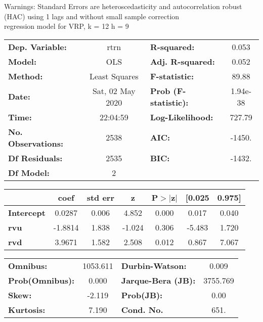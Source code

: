 Warnings: \newline
 [1] Standard Errors are heteroscedasticity and autocorrelation robust (HAC) using 1 lags and without small sample correction\\ 

regression model for VRP, k = 12 h = 9\begin{center}
\begin{tabular}{lclc}
\toprule
\textbf{Dep. Variable:}    &       rtrn       & \textbf{  R-squared:         } &     0.053   \\
\textbf{Model:}            &       OLS        & \textbf{  Adj. R-squared:    } &     0.052   \\
\textbf{Method:}           &  Least Squares   & \textbf{  F-statistic:       } &     89.88   \\
\textbf{Date:}             & Sat, 02 May 2020 & \textbf{  Prob (F-statistic):} &  1.94e-38   \\
\textbf{Time:}             &     22:04:59     & \textbf{  Log-Likelihood:    } &    727.79   \\
\textbf{No. Observations:} &        2538      & \textbf{  AIC:               } &    -1450.   \\
\textbf{Df Residuals:}     &        2535      & \textbf{  BIC:               } &    -1432.   \\
\textbf{Df Model:}         &           2      & \textbf{                     } &             \\
\bottomrule
\end{tabular}
\begin{tabular}{lcccccc}
                   & \textbf{coef} & \textbf{std err} & \textbf{z} & \textbf{P$> |$z$|$} & \textbf{[0.025} & \textbf{0.975]}  \\
\midrule
\textbf{Intercept} &       0.0287  &        0.006     &     4.852  &         0.000        &        0.017    &        0.040     \\
\textbf{rvu}       &      -1.8814  &        1.838     &    -1.024  &         0.306        &       -5.483    &        1.720     \\
\textbf{rvd}       &       3.9671  &        1.582     &     2.508  &         0.012        &        0.867    &        7.067     \\
\bottomrule
\end{tabular}
\begin{tabular}{lclc}
\textbf{Omnibus:}       & 1053.611 & \textbf{  Durbin-Watson:     } &    0.009  \\
\textbf{Prob(Omnibus):} &   0.000  & \textbf{  Jarque-Bera (JB):  } & 3755.769  \\
\textbf{Skew:}          &  -2.119  & \textbf{  Prob(JB):          } &     0.00  \\
\textbf{Kurtosis:}      &   7.190  & \textbf{  Cond. No.          } &     651.  \\
\bottomrule
\end{tabular}
\end{center}

